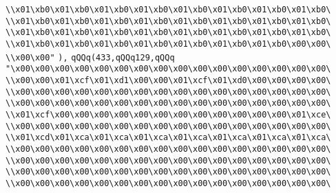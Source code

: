\verb|\\x01\xb0\x01\xb0\x01\xb0\x01\xb0\x01\xb0\x01\xb0\x01\xb0\x01\xb0\|\newline
\verb|\\x01\xb0\x01\xb0\x01\xb0\x01\xb0\x01\xb0\x01\xb0\x01\xb0\x01\xb0\|\newline
\verb|\\x01\xb0\x01\xb0\x01\xb0\x01\xb0\x01\xb0\x01\xb0\x01\xb0\x01\xb0\|\newline
\verb|\\x01\xb0\x01\xb0\x01\xb0\x01\xb0\x01\xb0\x01\xb0\x01\xb0\x00\x00\|\newline
\verb|\\x00\x00"|\newline
\verb|),|\newline
\verb|qQQq(433,qQQq129,qQQq|\newline
\verb|"\x00\x00\x00\x00\x00\x00\x00\x00\x00\x00\x00\x00\x00\x00\x00\x00\|\newline
\verb|\\x00\x00\x01\xcf\x01\xd1\x00\x00\x01\xcf\x01\xd0\x00\x00\x00\x00\|\newline
\verb|\\x00\x00\x00\x00\x00\x00\x00\x00\x00\x00\x00\x00\x00\x00\x00\x00\|\newline
\verb|\\x00\x00\x00\x00\x00\x00\x00\x00\x00\x00\x00\x00\x00\x00\x00\x00\|\newline
\verb|\\x01\xcf\x00\x00\x00\x00\x00\x00\x00\x00\x00\x00\x00\x00\x01\xce\|\newline
\verb|\\x00\x00\x00\x00\x00\x00\x00\x00\x00\x00\x00\x00\x00\x00\x00\x00\|\newline
\verb|\\x01\xcd\x01\xca\x01\xca\x01\xca\x01\xca\x01\xca\x01\xca\x01\xca\|\newline
\verb|\\x00\x00\x00\x00\x00\x00\x00\x00\x00\x00\x00\x00\x00\x00\x00\x00\|\newline
\verb|\\x00\x00\x00\x00\x00\x00\x00\x00\x00\x00\x00\x00\x00\x00\x00\x00\|\newline
\verb|\\x00\x00\x00\x00\x00\x00\x00\x00\x00\x00\x00\x00\x00\x00\x00\x00\|\newline
\verb|\\x00\x00\x00\x00\x00\x00\x00\x00\x00\x00\x00\x00\x00\x00\x00\x00\|\newline
